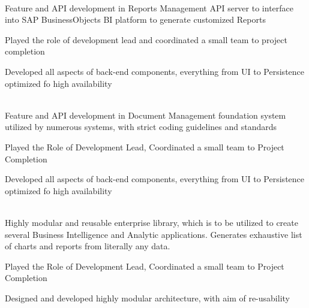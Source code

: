 \documentclass[]{deedy-resume-openfont}
\begin{document}

\clearpage

\hfill {}\\
Feature and API development in Reports Management API server to interface into SAP BusinessObjects BI platform to generate customized Reports\\
\begin{tightemize}
	\item Played the role of development lead and coordinated a small team to project completion
	\item Developed all aspects of back-end components, everything from UI to Persistence optimized fo high availability
\end{tightemize}
\sectionsep

\hfill {}\\
Feature and API development in Document Management foundation system utilized by numerous systems, with strict coding guidelines and standards\\
\begin{tightemize}
	\item Played the Role of Development Lead, Coordinated a small team to Project Completion
	\item Developed all aspects of back-end components, everything from UI to Persistence optimized fo high availability
\end{tightemize}
\sectionsep

\hfill {}\\
Highly modular and reusable enterprise library, which is to be utilized to create several Business Intelligence and Analytic applications. Generates exhaustive list of charts and reports from literally any data.\\
\begin{tightemize}
	\item Played the Role of Development Lead, Coordinated a small team to Project Completion
	\item Designed and developed highly modular architecture, with aim of re-usability
\end{tightemize}
\sectionsep
\end{document}
